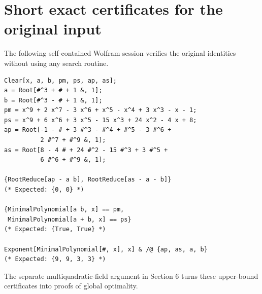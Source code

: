 \documentclass[11pt,letterpaper]{article}
\theoremstyle{definition}
\begin{document}
\section{Short exact certificates for the original input}
The following self-contained Wolfram session verifies the original identities without using any search routine.
\begin{samepage}
\begin{lstlisting}
Clear[x, a, b, pm, ps, ap, as];
a = Root[#^3 + # + 1 &, 1];
b = Root[#^3 - # + 1 &, 1];
pm = x^9 + 2 x^7 - 3 x^6 + x^5 - x^4 + 3 x^3 - x - 1;
ps = x^9 + 6 x^6 + 3 x^5 - 15 x^3 + 24 x^2 - 4 x + 8;
ap = Root[-1 - # + 3 #^3 - #^4 + #^5 - 3 #^6 +
          2 #^7 + #^9 &, 1];
as = Root[8 - 4 # + 24 #^2 - 15 #^3 + 3 #^5 +
          6 #^6 + #^9 &, 1];

{RootReduce[ap - a b], RootReduce[as - a - b]}
(* Expected: {0, 0} *)

{MinimalPolynomial[a b, x] == pm,
 MinimalPolynomial[a + b, x] == ps}
(* Expected: {True, True} *)

Exponent[MinimalPolynomial[#, x], x] & /@ {ap, as, a, b}
(* Expected: {9, 9, 3, 3} *)
\end{lstlisting}
\end{samepage}
The separate multiquadratic-field argument in Section 6 turns these upper-bound certificates into proofs of global optimality.
\end{document}
